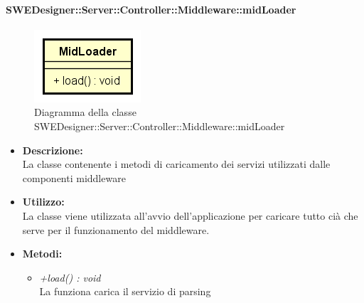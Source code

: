       \paragraph{SWEDesigner::Server::Controller::Middleware::midLoader}
      	\begin{figure}[h!]
		\centering
		\includegraphics[scale=0.8]{Classi/MidLoader.png}
		\caption{Diagramma della classe SWEDesigner::Server::Controller::Middleware::midLoader}
 		\end{figure}
        \begin{itemize}
          \item \textbf{Descrizione: }\\
          La classe contenente i metodi di caricamento dei servizi utilizzati dalle componenti middleware
          \item \textbf{Utilizzo: }\\
          La classe viene utilizzata all'avvio dell'applicazione per caricare tutto cià che serve per il funzionamento del middleware.
          \item \textbf{Metodi:}\\
          \begin{itemize}
            \item \emph{+load() : void}\\
            La funziona carica il servizio di parsing
          \end{itemize}
        \end{itemize}
